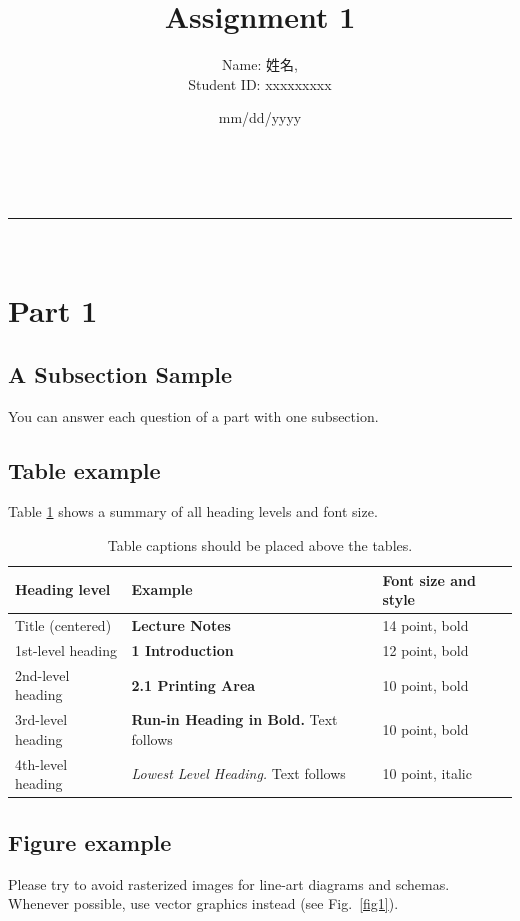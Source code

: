 \documentclass[a4paper,11pt]{article}
\makeatletter
\newcommand{\linia}{\rule{\linewidth}{0.5pt}}
\renewcommand{\maketitle}{
\begin{center}
\vspace{2ex}
{\huge \textsc{\@title}}
\vspace{1ex}
\\
\linia\\
\@author \hfill \@date
\vspace{4ex}
\end{center}
}
\makeatother
\begin{document}
\title{Assignment 1}


\author{
\begin{CJK*}{UTF8}{gbsn}
Name: 姓名,
\end{CJK*}
Student ID: xxxxxxxxx}

\date{mm/dd/yyyy}

\maketitle

\section{Part 1}
\subsection{A Subsection Sample}

You can answer each question of a part with one subsection.

\subsection{Table example}
Table \ref{tab1} shows a summary of all heading levels and font size.

\begin{table}[h]
\centering
\caption{Table captions should be placed above the
tables.}\label{tab1}
\begin{tabular}{|l|l|l|}
\hline
Heading level &  Example & Font size and style\\
\hline
Title (centered) &  {\Large\bfseries Lecture Notes} & 14 point, bold\\
1st-level heading &  {\large\bfseries 1 Introduction} & 12 point, bold\\
2nd-level heading & {\bfseries 2.1 Printing Area} & 10 point, bold\\
3rd-level heading & {\bfseries Run-in Heading in Bold.} Text follows & 10 point, bold\\
4th-level heading & {\itshape Lowest Level Heading.} Text follows & 10 point, italic\\
\hline
\end{tabular}
\end{table}

\subsection{Figure example}
Please try to avoid rasterized images for line-art diagrams and
schemas. Whenever possible, use vector graphics instead (see
Fig.~\ref{fig1}).
\end{document}
